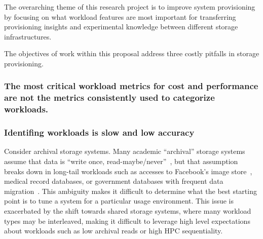 The overarching theme of this research project is
to improve system provisioning by focusing on what workload features are most important for transferring
provisioning insights and experimental knowledge between different storage infrastructures.



The objectives of work within this proposal address three costly pitfalls in
storage provisioning.

\subsubsection*{The most critical workload metrics for cost and performance are not the
metrics consistently used to categorize workloads.}



\subsubsection*{Identifing workloads is slow and low accuracy}

Consider archival storage systems. Many academic
``archival'' storage systems assume that data is ``write once,
read-maybe/never''~\cite{storerfast2008,venti,deepstore}, but that assumption
breaks down in long-tail workloads such as accesses to Facebook's image
store~\cite{facebook-photocache-SOSP}, medical record databases,  or government databases with frequent
data migration~\cite{ian-tos}.  
This ambiguity makes it difficult to determine
what the best starting point is to tune a system for a particular usage
environment.  %
This issue is exacerbated by the
shift towards shared storage systems, where many workload types may be
interleaved, making it difficult to leverage high level expectations about
workloads such as low archival reads or high HPC sequentiality.%


